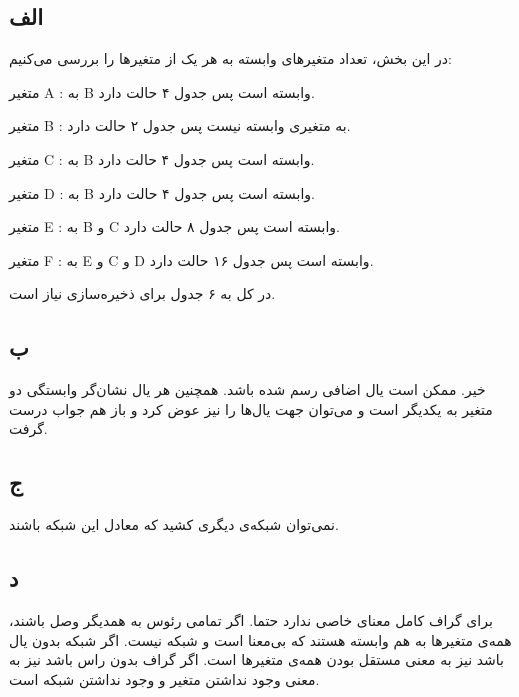 \subsection*{الف}

در این بخش، تعداد متغیرهای وابسته به هر یک از متغیرها را بررسی می‌کنیم:

متغیر A : به B وابسته است پس جدول ۴ حالت دارد.


متغیر B : به متغیری وابسته نیست پس جدول ۲ حالت دارد.


متغیر C : به B وابسته است پس جدول ۴ حالت دارد.


متغیر D : به B وابسته است پس جدول ۴ حالت دارد.


متغیر E : به B و C وابسته است پس جدول ۸ حالت دارد.


متغیر F : به E و C و D وابسته است پس جدول ۱۶ حالت دارد.


در کل به ۶ جدول برای ذخیره‌سازی نیاز است.
\subsection*{ب}

خیر. ممکن است یال اضافی رسم شده باشد. همچنین هر یال نشان‌گر وابستگی دو متغیر به یکدیگر است و می‌توان جهت یال‌ها را نیز عوض کرد و باز هم جواب درست گرفت.

\subsection*{ج}

نمی‌توان شبکه‌ی دیگری کشید که معادل این شبکه باشند.

\subsection*{د}

برای گراف کامل معنای خاصی ندارد حتما. اگر تمامی رئوس به همدیگر وصل باشند، همه‌ی متغیرها به هم وابسته هستند که بی‌معنا است و شبکه نیست. اگر شبکه بدون یال باشد نیز به معنی مستقل بودن همه‌ی متغیرها است. اگر گراف بدون راس باشد نیز به معنی وجود نداشتن متغیر و وجود نداشتن شبکه است.


